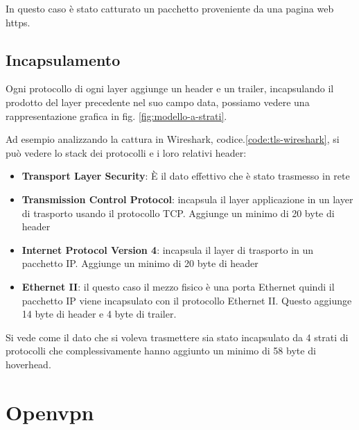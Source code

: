 In questo caso è stato catturato un pacchetto proveniente da una pagina web https.

\subsection{Incapsulamento}

Ogni protocollo di ogni layer aggiunge un header e un trailer, incapsulando il prodotto del layer precedente nel suo campo data, possiamo vedere una rappresentazione grafica in fig. \ref{fig:modello-a-strati}.


Ad esempio analizzando la cattura in Wireshark, codice.\ref{code:tls-wireshark}, si può vedere lo stack dei protocolli e i loro relativi header:

\begin{itemize}
    \item \textbf{Transport Layer Security}\cite{RFC_8446}: È il dato effettivo che è stato trasmesso in rete

    \item \textbf{Transmission Control Protocol}\cite{RFC_0793}: incapsula il layer applicazione in un layer di trasporto usando il protocollo TCP. Aggiunge un minimo di 20 byte di header

    \item \textbf{Internet Protocol Version 4}\cite{RFC_0791}: incapsula il layer di trasporto in un pacchetto IP. Aggiunge un minimo di 20 byte di header

    \item \textbf{Ethernet II}\cite{ethernet-ii}: il questo caso il mezzo fisico è una porta Ethernet quindi il pacchetto IP viene incapsulato con il protocollo Ethernet II. Questo aggiunge 14 byte di header e 4 byte di trailer.
\end{itemize}

Si vede come il dato che si voleva trasmettere sia stato incapsulato da 4 strati di protocolli che complessivamente hanno aggiunto un minimo di 58 byte di hoverhead.


\section{Openvpn}

